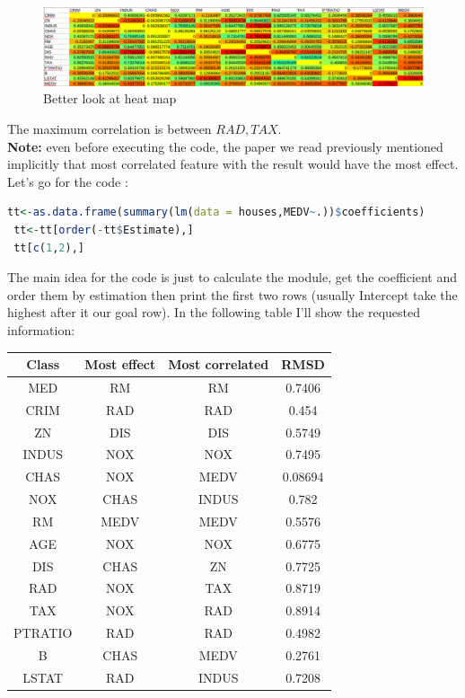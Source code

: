 \documentclass{article}
\begin{document}
\begin{landscape}
\begin{figure}[H]
	\includegraphics[scale=0.58]{heatmap2.png}
	\caption{Better look at heat map}
\end{figure}
The maximum correlation is between \(RAD,TAX\).\\
\textbf{Note: }even before executing the code, the paper we read previously mentioned implicitly that most correlated feature with the result would have the most effect.
 Let's go for the code :
 \begin{lstlisting}[language=R]
 tt<-as.data.frame(summary(lm(data = houses,MEDV~.))$coefficients)
 tt<-tt[order(-tt$Estimate),]
 tt[c(1,2),]
 \end{lstlisting} 
 The main idea for the code is just to calculate the module, get the coefficient and order them by estimation then print the first two rows (usually Intercept take the highest after it our goal row). In the following table I'll show the requested information:\\
 \begin{tabular}{|c|c|c|c|}
 	\hline
 	Class&Most effect&Most correlated&RMSD\\ \hline
 	MED&RM&RM&0.7406\\ \hline
 	CRIM&RAD&RAD&0.454\\ \hline
 	ZN&DIS&DIS&0.5749\\ \hline
 	INDUS&NOX&NOX&0.7495\\ \hline
 	CHAS&NOX&MEDV&0.08694\\ \hline
 	NOX&CHAS&INDUS&0.782\\ \hline
 	RM&MEDV&MEDV&0.5576\\ \hline
 	AGE&NOX&NOX&0.6775\\ \hline
 	DIS&CHAS&ZN&0.7725\\ \hline
 	RAD&NOX&TAX&0.8719\\ \hline
 	TAX&NOX&RAD&0.8914\\ \hline
 	PTRATIO&RAD&RAD&0.4982\\ \hline
 	B&CHAS&MEDV&0.2761\\ \hline
 	LSTAT&RAD&INDUS&0.7208\\ \hline
 \end{tabular}
\end{landscape}
\end{document}
